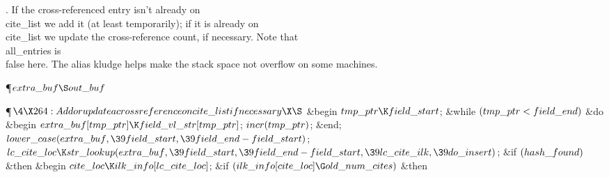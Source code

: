 .
If the cross-referenced entry isn't already on \\{cite\_list} we add it
(at least temporarily); if it is already on \\{cite\_list} we update the
cross-reference count, if necessary.  Note that \\{all\_entries} is
\\{false} here.  The alias kludge helps make the stack space not
overflow on some machines.

\Y\P\D {}$\\{extra\_buf}\S\\{out\_buf}$%
\par
\Y\P$\4\X264:Add or update a cross reference on \\{cite\_list} if necessary\X%
\S$\6
\&{begin} $\\{tmp\_ptr}\K\\{field\_start}$;\6
\&{while} $(\\{tmp\_ptr}<\\{field\_end})$ \1\&{do}\6
\&{begin} $\\{extra\_buf}[\\{tmp\_ptr}]\K\\{field\_vl\_str}[\\{tmp\_ptr}]$;\5
$\\{incr}(\\{tmp\_ptr})$;\6
\&{end};\2\6
$\\{lower\_case}(\\{extra\_buf},\39\\{field\_start},\39\\{field\_end}-\\{field%
\_start})$;\6
$\\{lc\_cite\_loc}\K\\{str\_lookup}(\\{extra\_buf},\39\\{field\_start},\39%
\\{field\_end}-\\{field\_start},\39\\{lc\_cite\_ilk},\39\\{do\_insert})$;\6
\&{if} $(\\{hash\_found})$ \1\&{then}\6
\&{begin} $\\{cite\_loc}\K\\{ilk\_info}[\\{lc\_cite\_loc}]$;\6
\&{if} $(\\{ilk\_info}[\\{cite\_loc}]\G\\{old\_num\_cites})$ \1\&{then}\6
